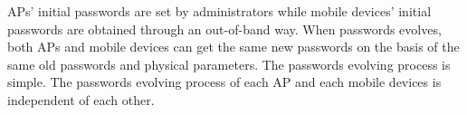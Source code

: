 	
APs’ initial passwords are set by administrators while mobile devices’ initial passwords are obtained through an out-of-band way. When passwords evolves, both APs and mobile devices can get the same new passwords on the basis of the same old passwords and physical parameters. The passwords evolving process is simple. The passwords evolving process of each AP and each mobile devices is independent of each other. 
